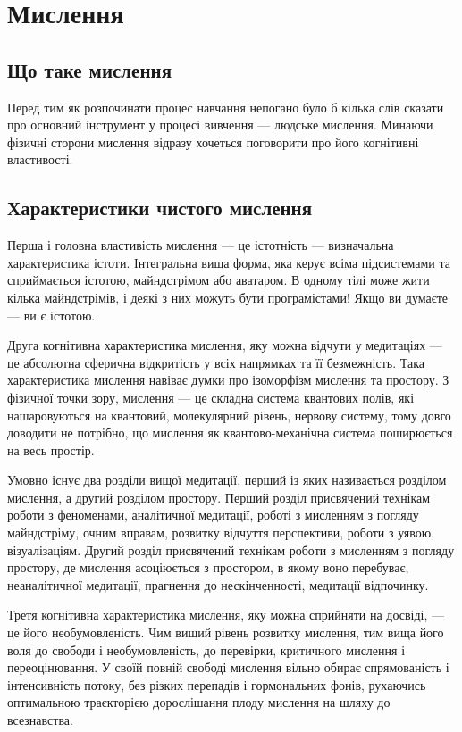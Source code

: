 \section{Мислення}

\subsection{Що таке мислення}

Перед тим як розпочинати процес навчання непогано було
б кілька слів сказати про основний інструмент у процесі
вивчення --- людське мислення. Минаючи фізичні сторони
мислення відразу хочеться поговорити про його когнітивні властивості.

\subsection{Характеристики чистого мислення}

Перша і головна властивість мислення --- це істотність ---
визначальна характеристика істоти. Інтегральна вища форма,
яка керує всіма підсистемами та сприймається істотою,
майндстрімом або аватаром. В одному тілі може жити
кілька майндстрімів, і деякі з них можуть бути програмістами!
Якщо ви думаєте --- ви є істотою.

Друга когнітивна характеристика мислення, яку можна
відчути у медитаціях --- це абсолютна сферична відкритість
у всіх напрямках та її безмежність. Така характеристика
мислення навіває думки про ізоморфізм мислення та простору.
З фізичної точки зору, мислення --- це складна система квантових
полів, які нашаровуються на квантовий, молекулярний рівень,
нервову систему, тому довго доводити не потрібно, що
мислення як квантово-механічна система поширюється на весь простір.

Умовно існує два розділи вищої медитації, перший із яких
називається розділом мислення, а другий розділом простору.
Перший розділ присвячений технікам роботи з феноменами,
аналітичної медитації, роботі з мисленням з погляду
майндстріму, очним вправам, розвитку відчуття перспективи,
роботи з уявою, візуалізаціям. Другий розділ присвячений
технікам роботи з мисленням з погляду простору, де мислення
асоціюється з простором, в якому воно перебуває,
неаналітичної медитації, прагнення до нескінченності,
медитації відпочинку.

Третя когнітивна характеристика мислення, яку можна
сприйняти на досвіді, --- це його необумовленість.
Чим вищий рівень розвитку мислення, тим вища його
воля до свободи і необумовленість, до перевірки,
критичного мислення і переоцінювання. У своїй повній
свободі мислення вільно обирає спрямованість і інтенсивність
потоку, без різких перепадів і гормональних фонів,
рухаючись оптимальною траєкторією дорослішання плоду
мислення на шляху до всезнавства.

